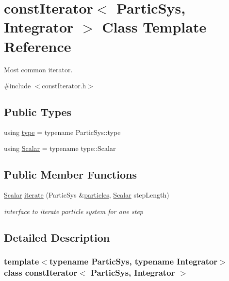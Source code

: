 \hypertarget{classconst_iterator}{}\section{const\+Iterator$<$ Partic\+Sys, Integrator $>$ Class Template Reference}
\label{classconst_iterator}


Most common iterator.  




{\ttfamily \#include $<$const\+Iterator.\+h$>$}

\subsection*{Public Types}
\begin{DoxyCompactItemize}
\item 
using \mbox{\hyperlink{classconst_iterator_aa4809910ddae08b6ffd78046ee05061e}{type}} = typename Partic\+Sys\+::type
\item 
using \mbox{\hyperlink{classconst_iterator_a524fa9110f25e60075d8ec02e5f5bb71}{Scalar}} = typename type\+::\+Scalar
\end{DoxyCompactItemize}
\subsection*{Public Member Functions}
\begin{DoxyCompactItemize}
\item 
\mbox{\hyperlink{classconst_iterator_a524fa9110f25e60075d8ec02e5f5bb71}{Scalar}} \mbox{\hyperlink{classconst_iterator_af7cdfe1f6ab00dab9942645d5306ea32}{iterate}} (Partic\+Sys \&\mbox{\hyperlink{classparticles}{particles}}, \mbox{\hyperlink{classconst_iterator_a524fa9110f25e60075d8ec02e5f5bb71}{Scalar}} step\+Length)
\begin{DoxyCompactList}\small\item\em interface to iterate particle system for one step \end{DoxyCompactList}\end{DoxyCompactItemize}


\subsection{Detailed Description}
\subsubsection*{template$<$typename Partic\+Sys, typename Integrator$>$\newline
class const\+Iterator$<$ Partic\+Sys, Integrator $>$}

